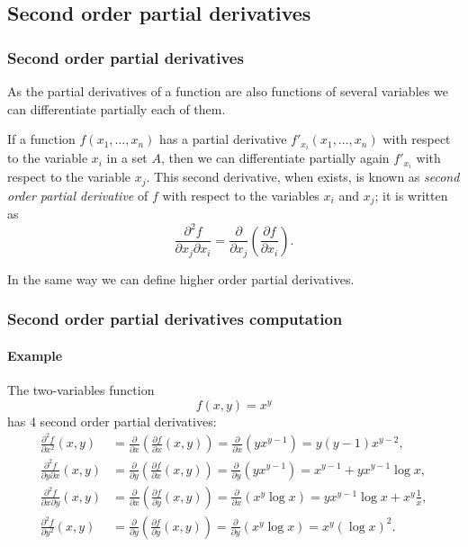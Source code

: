 \subsection{Second order partial derivatives}
\begin{frame}
\frametitle{Second order partial derivatives}
As the partial derivatives of a function are also functions of several variables we can differentiate partially each of them.

If a function $f(x_1,\ldots,x_n)$ has a partial derivative $f'_{x_i}(x_1,\ldots,x_n)$ with respect to the variable $x_i$ in a set $A$, then we can differentiate partially again $f'_{x_i}$ with respect to the variable $x_j$.
This second derivative, when exists, is known as \emph{second order partial derivative} of $f$ with respect to the variables $x_i$ and $x_j$; it is written as
\[
\frac{\partial ^2 f}{\partial x_j \partial x_i}= \frac{\partial}{\partial x_j}\left(\frac{\partial f}{\partial x_i}\right).
\]

In the same way we can define higher order partial derivatives.
\end{frame}


\begin{frame}
\frametitle{Second order partial derivatives computation}
\framesubtitle{Example}
The two-variables function
\[f(x,y)=x^y\]
has 4 second order partial derivatives:
\begin{align*}
\frac{\partial^2 f}{\partial x^2}(x,y) &=
\frac{\partial}{\partial x}\left(\frac{\partial f}{\partial x}(x,y)\right) =
\frac{\partial}{\partial x}\left(yx^{y-1}\right) =
y(y-1)x^{y-2},\\
\frac{\partial^2 f}{\partial y \partial x}(x,y) &=
\frac{\partial}{\partial y}\left(\frac{\partial f}{\partial x}(x,y)\right) =
\frac{\partial}{\partial y}\left(yx^{y-1}\right) =
x^{y-1}+yx^{y-1}\log x,\\
\frac{\partial^2 f}{\partial x \partial y}(x,y) &=
\frac{\partial}{\partial x}\left(\frac{\partial f}{\partial y}(x,y)\right) =
\frac{\partial}{\partial x}\left(x^y\log x \right) =
yx^{y-1}\log x+x^y\frac{1}{x},\\
\frac{\partial^2 f}{\partial y^2}(x,y) &=
\frac{\partial}{\partial y}\left(\frac{\partial f}{\partial y}(x,y)\right) =
\frac{\partial}{\partial y}\left(x^y\log x \right) =
x^y(\log x)^2.
\end{align*}
\end{frame}



